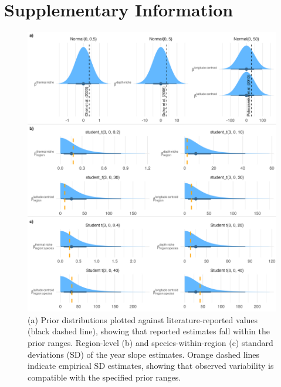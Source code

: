 \documentclass[11pt]{article}
\begin{document}
\section{Supplementary Information}



\newpage

\begin{figure}[h]
    \centering
        \includegraphics[scale=0.7]{output/figures/prior_checks.png}
    \caption{(a) Prior distributions plotted against literature-reported values (black dashed line), showing that reported estimates fall within the prior ranges.
 Region-level (b) and species-within-region (c) standard deviations (SD) of the year slope estimates. Orange dashed lines indicate empirical SD estimates, showing that observed variability is compatible with the specified prior ranges.
}
    \label{fig:priors}
\end{figure}

\newpage
\end{document}
